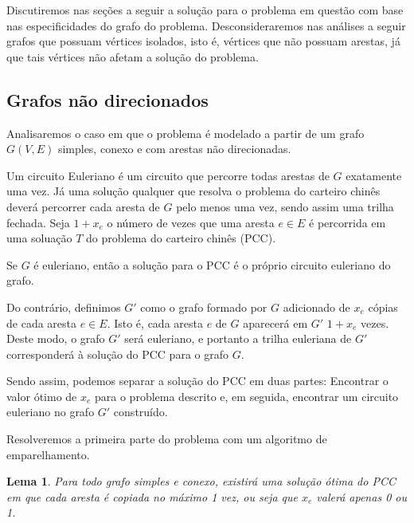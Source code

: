 \documentclass[12pt, a4paper]{article}
\newtheorem{lemma}{Lema}
\begin{document}
Discutiremos nas seções a seguir a solução para o problema em questão com base nas especificidades do grafo do problema. 
Desconsideraremos nas análises a seguir grafos que possuam vértices isolados, isto é, vértices que não possuam arestas, já que tais vértices não afetam a solução do problema.

\subsection{Grafos não direcionados}

Analisaremos o caso em que o problema é modelado a partir de um grafo $G(V, E)$ simples, conexo e com arestas não direcionadas.

Um circuito Euleriano é um circuito que percorre todas arestas de $G$ exatamente uma vez. 
Já uma solução qualquer que resolva o problema do carteiro chinês deverá percorrer cada aresta de $G$ pelo menos uma vez, sendo assim uma trilha fechada.
Seja $1 + x_e$ o número de vezes que uma aresta $e \in E$ é percorrida em uma soluação $T$ do problema do carteiro chinês (PCC).

Se $G$ é euleriano, então a solução para o PCC é o próprio circuito euleriano do grafo.

Do contrário, definimos $G'$ como o grafo formado por $G$ adicionado de $x_e$ cópias de cada aresta $e \in E$. 
Isto é, cada aresta $e$ de $G$ aparecerá em $G'$ $1 + x_e$ vezes.
Deste modo, o grafo $G'$ será euleriano, e portanto a trilha euleriana de $G'$ corresponderá à solução do PCC para o grafo $G$.

Sendo assim, podemos separar a solução do PCC em duas partes: Encontrar o valor ótimo de $x_e$ para o problema descrito e, em seguida, encontrar um circuito euleriano no grafo $G'$ construído.

Resolveremos a primeira parte do problema com um algoritmo de emparelhamento.



\begin{lemma} 
    \label{lemma-pcc}
    Para todo grafo simples e conexo, existirá uma solução ótima do PCC em que cada aresta é copiada no máximo 1 vez, ou seja que $x_e$ valerá apenas 0 ou 1. 
\end{lemma}
\end{document}
